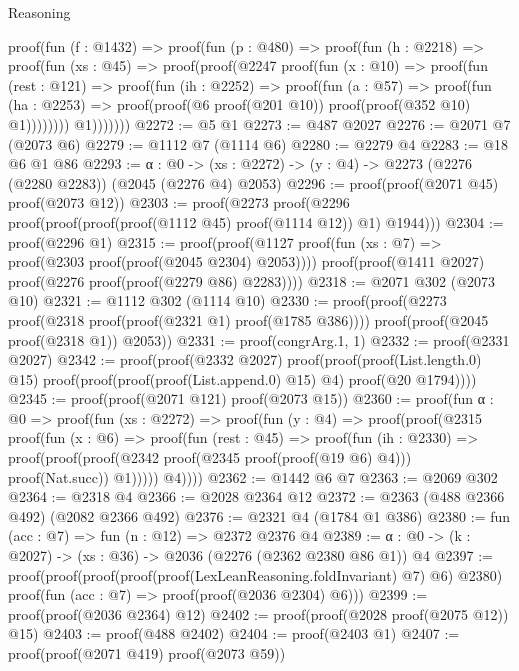\begin{lexlean}{Reasoning}
\begin{coremodule}
      proof(fun (f : @1432) =>
        proof(fun (p : @480) =>
          proof(fun (h : @2218) =>
            proof(fun (xs : @45) =>
              proof(proof(@2247
                    proof(fun (x : @10) =>
                      proof(fun (rest : @121) =>
                        proof(fun (ih : @2252) =>
                          proof(fun (a : @57) =>
                            proof(fun (ha : @2253) =>
                              proof(proof(@6 proof(@201 @10)) proof(proof(@352 @10) @1))))))))
                  @1)))))))
@2272 := @5 @1
@2273 := @487 @2027
@2276 := @2071 @7 (@2073 @6)
@2279 := @1112 @7 (@1114 @6)
@2280 := @2279 @4
@2283 := @18 @6 @1 @86
@2293 := {α : @0} ->
  (xs : @2272) -> (y : @4) -> @2273 (@2276 (@2280 @2283)) (@2045 (@2276 @4) @2053)
@2296 := proof(proof(@2071 @45) proof(@2073 @12))
@2303 := proof(@2273 proof(@2296 proof(proof(proof(proof(@1112 @45) proof(@1114 @12)) @1) @1944)))
@2304 := proof(@2296 @1)
@2315 := proof(proof(@1127 proof(fun (xs : @7) => proof(@2303 proof(proof(@2045 @2304) @2053))))
      proof(proof(@1411 @2027) proof(@2276 proof(proof(@2279 @86) @2283))))
@2318 := @2071 @302 (@2073 @10)
@2321 := @1112 @302 (@1114 @10)
@2330 := proof(proof(@2273 proof(@2318 proof(proof(@2321 @1) proof(@1785 @386))))
      proof(proof(@2045 proof(@2318 @1)) @2053))
@2331 := proof(congrArg.{1, 1})
@2332 := proof(@2331 @2027)
@2342 := proof(proof(@2332 @2027)
      proof(proof(proof(List.length.{0}) @15)
          proof(proof(proof(proof(List.append.{0}) @15) @4) proof(@20 @1794))))
@2345 := proof(proof(@2071 @121) proof(@2073 @15))
@2360 := proof(fun {α : @0} =>
    proof(fun (xs : @2272) =>
      proof(fun (y : @4) =>
        proof(proof(@2315
              proof(fun (x : @6) =>
                proof(fun (rest : @45) =>
                  proof(fun (ih : @2330) =>
                    proof(proof(proof(@2342 proof(@2345 proof(proof(@19 @6) @4))) proof(Nat.succ))
                        @1)))))
            @4))))
@2362 := @1442 @6 @7
@2363 := @2069 @302
@2364 := @2318 @4
@2366 := @2028 @2364 @12
@2372 := @2363 (@488 @2366 @492) (@2082 @2366 @492)
@2376 := @2321 @4 (@1784 @1 @386)
@2380 := fun (acc : @7) => fun (n : @12) => @2372 @2376 @4
@2389 := {α : @0} -> (k : @2027) -> (xs : @36) -> @2036 (@2276 (@2362 @2380 @86 @1)) @4
@2397 := proof(proof(proof(proof(proof(LexLeanReasoning.foldInvariant) @7) @6) @2380)
      proof(fun (acc : @7) => proof(proof(@2036 @2304) @6)))
@2399 := proof(proof(@2036 @2364) @12)
@2402 := proof(proof(@2028 proof(@2075 @12)) @15)
@2403 := proof(@488 @2402)
@2404 := proof(@2403 @1)
@2407 := proof(proof(@2071 @419) proof(@2073 @59))

\end{coremodule}
\end{lexlean}
